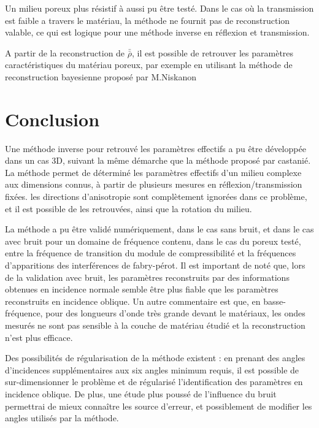 \documentclass[twoside,openright]{report}
\begin{document}
    Un milieu poreux plus résistif à aussi pu être testé. Dans le cas où la transmission  est faible a travers le matériau, la méthode ne fournit pas de reconstruction valable, ce qui est logique pour une méthode inverse en réflexion et transmission.
    
    A partir de la reconstruction de $\bar{\bar{\rho}}$, il est possible de retrouver les paramètres caractéristiques du matériau poreux, par exemple en utilisant la méthode de reconstruction bayesienne proposé  par M.Niskanon\cite{Niskanen}
\chapter*{Conclusion}
    Une méthode inverse pour retrouvé les paramètres effectifs a pu être développée dans un cas 3D, suivant la même démarche que la méthode proposé par castanié\cite{Castanie}. La méthode permet de déterminé les paramètres effectifs d'un milieu complexe aux dimensions connus, à partir de plusieurs mesures en réflexion/transmission fixées. les directions d'anisotropie sont complètement ignorées dans ce problème, et il est possible de les retrouvées, ainsi que la rotation du milieu. 
    
    La méthode a pu être validé numériquement, dans le cas sans bruit, et dans le cas avec bruit pour un domaine de fréquence contenu, dans le cas du poreux testé, entre la fréquence de transition du module de compressibilité et la fréquences d'apparitions des interférences de fabry-pérot.
    Il est important de noté que, lors de la validation avec bruit, les paramètres reconstruits par des informations obtenues en incidence normale semble être plus fiable que les paramètres reconstruits en incidence oblique. Un autre commentaire est que, en basse-fréquence, pour des longueurs d'onde très grande devant le matériaux, les ondes mesurés ne sont pas sensible à la couche de matériau étudié et la reconstruction n'est plus efficace.
    
    Des possibilités de régularisation de la méthode existent : en prenant des angles d'incidences supplémentaires aux six angles minimum requis, il est possible de sur-dimensionner le problème et de régularisé l'identification des paramètres en incidence oblique. De plus, une étude plus poussé de l'influence du bruit permettrai de mieux connaître les source d'erreur, et possiblement de modifier les angles utilisés par la méthode.
    
\end{document}
